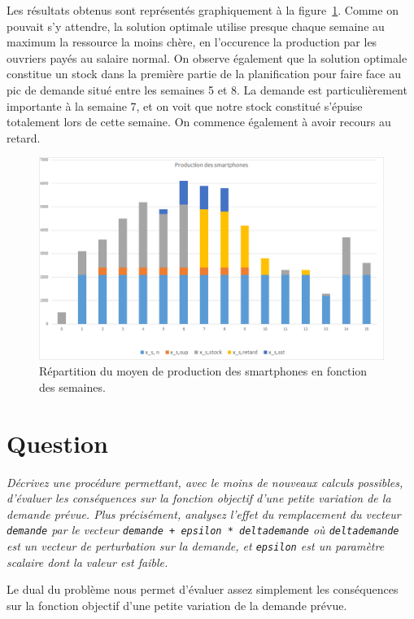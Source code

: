 \documentclass[12pt,oneside,a4paper]{article}
\newcommand{\question}
{
\addtocounter{section}{1}
\section*{Question \thesection}
}
\begin{document}
Les résultats obtenus sont représentés graphiquement 
à la figure~\ref{fig:grapheProduction}. 
Comme on pouvait s'y attendre, la solution optimale utilise presque chaque
semaine au maximum la ressource la moins chère,
en l'occurence la production par les ouvriers payés au salaire normal.
On observe également que la solution optimale constitue un stock dans la première partie de la planification pour faire face au pic de demande 
situé entre les semaines 5 et 8.
La demande est particulièrement importante à la semaine 7,
et on voit que notre stock constitué s'épuise totalement lors de cette semaine.
On commence également à avoir recours au retard.

\begin{figure}[H]
  \begin{center}
    \includegraphics[scale = 0.8]{grapheProduction.png}
	  \caption{Répartition du moyen de production des smartphones en fonction des semaines.}
	  \label{fig:grapheProduction}
  \end{center}
\end{figure}

\question %
\emph{Décrivez une procédure permettant, avec le moins de nouveaux calculs
possibles, d'évaluer les conséquences sur la fonction objectif d’une petite
variation de la demande prévue. Plus précisément, analysez l'effet du
remplacement du vecteur \texttt{demande} 
par le vecteur \texttt{demande + epsilon * delta\textunderscore demande} 
où \texttt{delta\textunderscore demande} est un vecteur de perturbation 
sur la demande, 
et \texttt{epsilon} est un paramètre scalaire dont la valeur est faible.}

Le dual du problème nous permet d'évaluer assez simplement
les conséquences sur la fonction objectif
d'une petite variation de la demande prévue.
\end{document}
